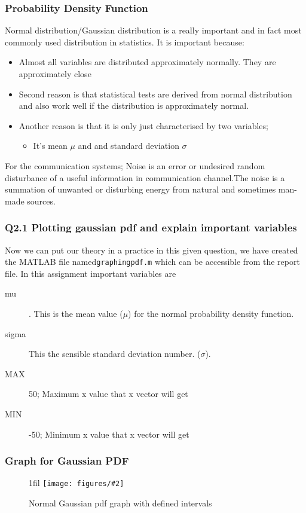 \documentclass{beamer}
\makeatletter
\newcommand{\code}[1]{\texttt{#1}}
\newcommand*{\centerfloat}{%
  \parindent \z@
  \leftskip \z@ \@plus 1fil \@minus \textwidth
  \rightskip\leftskip
  \parfillskip \z@skip}
\newcommand{\fig}[3]{
  \begin{figure}[H]
  \centerfloat
    \texttt{[image: figures/\#2]}
    \caption{#3}
  \end{figure}
}
\makeatother
\begin{document}
\begin{frame}
	\frametitle{Probability Density Function}

Normal distribution/Gaussian distribution is a really important and in fact most commonly used distribution in statistics.  It is important because:
	\begin{itemize}
		\item Almost all variables are distributed approximately normally. They are approximately close
		\item Second reason is that statistical tests are derived from normal distribution and also work well if the distribution is approximately normal.
		\item Another reason is that it is only just characterised by two variables;
			\begin{itemize}
				\item It's mean $\mu$ and and standard deviation $\sigma$
			\end{itemize}
	\end{itemize}
For the communication systems;
Noise is an error or undesired random disturbance of a useful information in communication channel.The noise is a summation of unwanted or disturbing energy from natural and sometimes man-made sources.
\end{frame}

\begin{frame}
	\frametitle{Q2.1 Plotting gaussian pdf and explain important variables}
Now we can put our theory in a practice in this given question, we have created the MATLAB file named\code{graphingpdf.m} which can be accessible from the report file. In this assignment important variables are

\begin{description}
	\item [mu] . This is the mean value ($\mu$) for the normal probability density function.
	\item [sigma] This the sensible standard deviation number. ($\sigma$).
	\item [MAX] 50; Maximum x value that x vector will get
	\item [MIN] -50; Minimum x value that x vector will get
\end{description}
\end{frame}

\begin{frame}
	\frametitle{Graph for Gaussian PDF}
\fig{5cm}{normalgaussiangraph.png}{Normal Gaussian pdf graph with defined intervals}
\end{frame}
\end{document}
